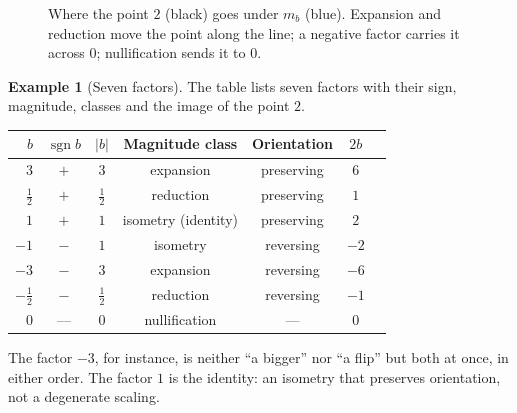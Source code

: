\documentclass[12pt]{article}
\theoremstyle{definition}
\newtheorem{example}[theorem]{Example}
\theoremstyle{remark}
\newcommand{\sgn}{\operatorname{sgn}}
\begin{document}
\begin{figure}[h]
\centering
{}
\caption{Where the point $2$ (black) goes under $m_b$ (blue). Expansion and reduction move the point along the line; a negative factor carries it across $0$; nullification sends it to $0$.}
\label{fig:numberline}
\end{figure}

\begin{example}[Seven factors]\label{ex:seven}
The table lists seven factors with their sign, magnitude, classes and the image of the point $2$.
\begin{center}
\begin{tabular}{@{}rcccccc@{}}
\toprule
$b$ & $\sgn b$ & $|b|$ & Magnitude class & Orientation & $2b$\\\midrule
$3$ & $+$ & $3$ & expansion & preserving & $6$\\
$\tfrac12$ & $+$ & $\tfrac12$ & reduction & preserving & $1$\\
$1$ & $+$ & $1$ & isometry (identity) & preserving & $2$\\
$-1$ & $-$ & $1$ & isometry & reversing & $-2$\\
$-3$ & $-$ & $3$ & expansion & reversing & $-6$\\
$-\tfrac12$ & $-$ & $\tfrac12$ & reduction & reversing & $-1$\\
$0$ & --- & $0$ & nullification & --- & $0$\\\bottomrule
\end{tabular}
\end{center}
The factor $-3$, for instance, is neither ``a bigger'' nor ``a flip'' but both at once, in either order. The factor $1$ is the identity: an isometry that preserves orientation, not a degenerate scaling.
\end{example}
\end{document}
